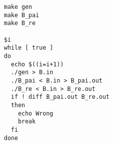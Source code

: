 \begin{lstlisting}
make gen
make B_pai
make B_re

$i
while [ true ]
do
  echo $((i=i+1))
  ./gen > B.in
  ./B_pai < B.in > B_pai.out
  ./B_re < B.in > B_re.out
  if ! diff B_pai.out B_re.out
  then
    echo Wrong
    break
  fi
done


\end{lstlisting}